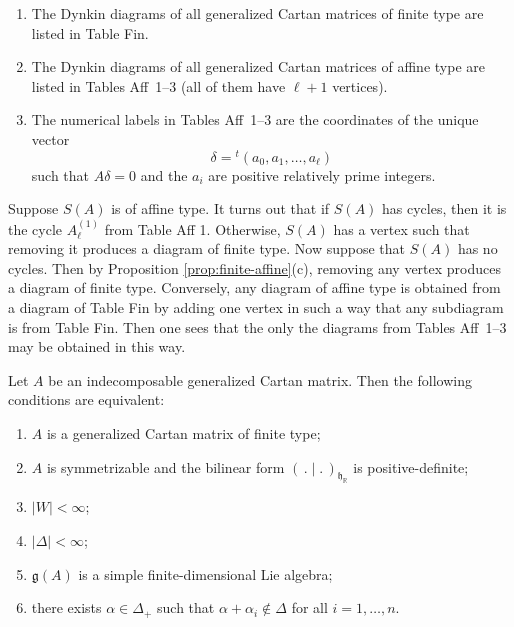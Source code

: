 \documentclass[12pt]{article}
\begin{document}
\begin{theorem}
    \leavevmode
    \begin{enumerate}[label=\alph*)]
        \item The Dynkin diagrams of all generalized Cartan matrices of finite type
              are listed in Table Fin.

        \item The Dynkin diagrams of all generalized Cartan matrices of affine type
              are listed in Tables Aff~1--3 (all of them have $\ell+1$ vertices).

        \item The numerical labels in Tables Aff~1--3 are the coordinates of the unique
              vector \[\delta = {}^t(a_0,a_1,\dots,a_\ell)\] such that $A\delta=0$ and the $a_i$
              are positive relatively prime integers.
    \end{enumerate}
\end{theorem}

\begin{remark}
    Suppose $S(A)$ is of affine type. It turns out that if $S(A)$ has cycles, then it is the cycle $A_\ell^{(1)}$ from Table Aff 1. Otherwise, $S(A)$ has a vertex such that removing it produces a diagram of finite type. Now suppose that $S(A)$ has no cycles. Then by Proposition \ref{prop:finite-affine}(c), removing any vertex produces a diagram of finite type. Conversely, any diagram of affine type is obtained from a diagram of Table Fin by adding one vertex in such a way that any subdiagram is from Table Fin. Then one sees that the only the diagrams from Tables Aff~1--3 may be obtained in this way.
\end{remark}

\begin{proposition}\label{prop:finite-char}
    Let $A$ be an indecomposable generalized Cartan matrix. Then the following
    conditions are equivalent:
    \begin{enumerate}[label=(\roman*)]
        \item $A$ is a generalized Cartan matrix of finite type;
        \item $A$ is symmetrizable and the bilinear form $(\,.\mid.\,)_{\mathfrak{h}_\mathbb{R}}$
              is positive-definite;
        \item $|W| < \infty$;
        \item $|\Delta| < \infty$;
        \item $\mathfrak{g}(A)$ is a simple finite-dimensional Lie algebra;
        \item there exists $\alpha \in \Delta_+$ such that $\alpha+\alpha_i \notin \Delta$
              for all $i=1,\dots,n$.
    \end{enumerate}
\end{proposition}
\end{document}
